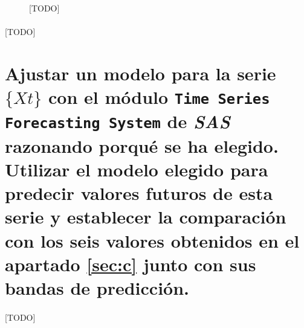 \documentclass[a4paper, spanish]{article}
\begin{document}
    \begin{figure}[h]
      \centering
      \inputminted{SAS}{./res/code/e-01-prediction-error-forecast-3.sas}
      \caption{[TODO]}
      \label{code:e_prediction_error_forecast_3}
    \end{figure}

    \paragraph{}
    [TODO]


  \section{Ajustar un modelo para la serie $\{ Xt \}$ con el módulo \texttt{Time Series Forecasting System} de \emph{SAS} razonando porqué se ha elegido. Utilizar el modelo elegido para predecir valores futuros de esta serie y establecer la comparación con los seis valores obtenidos en el apartado \ref{sec:c} junto con sus bandas de predicción.}
  \label{sec:f}

    \paragraph{}
    [TODO]
\end{document}
